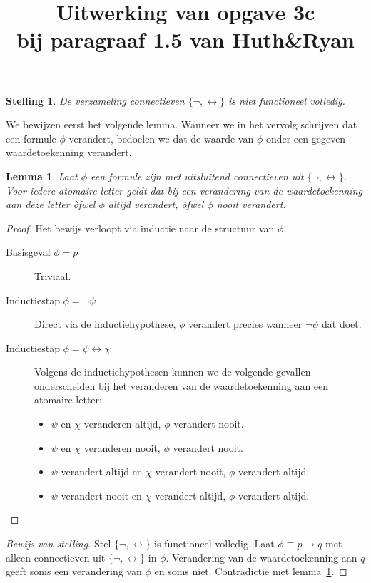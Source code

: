 \documentclass[a4paper,11pt]{article}
\title{Uitwerking van opgave 3c\\
\normalsize{bij paragraaf 1.5 van Huth\&Ryan}}
\date{}
\newtheorem{lemma}{Lemma}
\newtheorem*{theorem}{Stelling}
\begin{document}
\maketitle


\begin{theorem}\label{thm:incomplete}
  De verzameling connectieven $\{\neg, \leftrightarrow\}$ is niet functioneel
    volledig.
\end{theorem}

We bewijzen eerst het volgende lemma. Wanneer we in het vervolg
schrijven dat een formule $\phi$ verandert, bedoelen we dat de waarde van
$\phi$ onder een gegeven waardetoekenning verandert.

\begin{lemma}\label{lem:linear}
  Laat $\phi$ een formule zijn met uitsluitend connectieven uit
  $\{\neg, \leftrightarrow\}$.
  Voor iedere atomaire letter geldt dat bij een verandering van de
  waardetoekenning aan deze letter \`ofwel $\phi$ altijd verandert,
  \`ofwel $\phi$ nooit verandert.
\end{lemma}

\begin{proof}
  Het bewijs verloopt via inductie naar de structuur van $\phi$.

  \begin{description}
  \item[Basisgeval $\phi = p$]\hfill

    Triviaal.

  \item[Inductiestap $\phi = \neg \psi$]\hfill

    Direct via de inductiehypothese, $\phi$ verandert precies wanneer
    $\neg \psi$ dat doet.

  \item[Inductiestap $\phi = \psi \leftrightarrow \chi$]\hfill

    Volgens de inductiehypothesen kunnen we de volgende gevallen
    onderscheiden bij het veranderen van de waardetoekenning aan een atomaire
    letter:
    \begin{itemize}
      \item $\psi$ en $\chi$ veranderen altijd, $\phi$ verandert nooit.
      \item $\psi$ en $\chi$ veranderen nooit, $\phi$ verandert nooit.
      \item $\psi$ verandert altijd en $\chi$ verandert nooit, $\phi$ verandert altijd.
      \item $\psi$ verandert nooit en $\chi$ verandert altijd, $\phi$ verandert altijd.\qedhere
    \end{itemize}
\end{description}
\end{proof}

\begin{proof}[Bewijs van stelling]
  Stel $\{\neg, \leftrightarrow\}$ is functioneel volledig.
  Laat $\phi \equiv p \rightarrow q$ met alleen connectieven uit
  $\{\neg, \leftrightarrow\}$ in $\phi$.
  Verandering van de waardetoekenning aan $q$ geeft soms een verandering van
  $\phi$ en soms niet. Contradictie met lemma~\ref{lem:linear}.
\end{proof}
\end{document}

